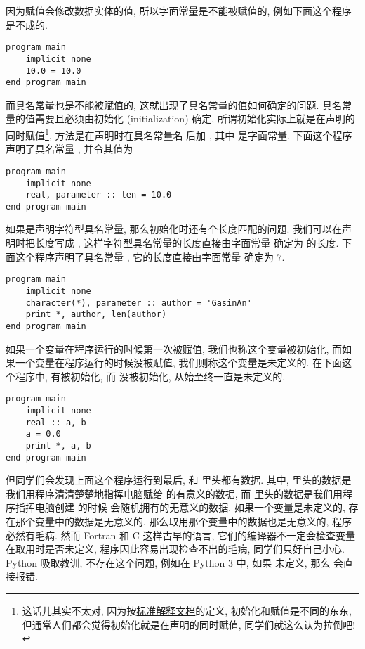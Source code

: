 因为赋值会修改数据实体的值, 所以字面常量是不能被赋值的, 例如下面这个程序是不成的.
\begin{lstlisting}
program main
    implicit none
    10.0 = 10.0
end program main
\end{lstlisting}
而具名常量也是不能被赋值的, 这就出现了具名常量的值如何确定的问题. 具名常量的值需要且必须由初始化 (initialization) 确定, 所谓初始化实际上就是在声明的同时赋值\footnote{这话儿其实不太对, 因为按\href{https://j3-fortran.org/doc/year/24/24-007.pdf}{标准解释文档}的定义, 初始化和赋值是不同的东东, 但通常人们都会觉得初始化就是在声明的同时赋值, 同学们就这么认为拉倒吧!}, 方法是在声明时在具名常量名 \ttt{[name]} 后加 \ttt{ = [value]}, 其中 \ttt{[value]} 是字面常量. 下面这个程序声明了具名常量 , 并令其值为 
\begin{lstlisting}
program main
    implicit none
    real, parameter :: ten = 10.0
end program main
\end{lstlisting}
如果是声明字符型具名常量, 那么初始化时还有个长度匹配的问题. 我们可以在声明时把长度写成 \ttt{*}, 这样字符型具名常量的长度直接由字面常量 \ttt{[value]} 确定为 \ttt{[value]} 的长度. 下面这个程序声明了具名常量 , 它的长度直接由字面常量  确定为 $7$.
\begin{lstlisting}
program main
    implicit none
    character(*), parameter :: author = 'GasinAn'
    print *, author, len(author)
end program main
\end{lstlisting}

如果一个变量在程序运行的时候第一次被赋值, 我们也称这个变量被初始化, 而如果一个变量在程序运行的时候没被赋值, 我们则称这个变量是未定义的. 在下面这个程序中,  有被初始化, 而  没被初始化, 从始至终一直是未定义的.
\begin{lstlisting}
program main
    implicit none
    real :: a, b
    a = 0.0
    print *, a, b
end program main
\end{lstlisting}
但同学们会发现上面这个程序运行到最后,  和  里头都有数据. 其中,  里头的数据是我们用程序清清楚楚地指挥电脑赋给  的有意义的数据, 而  里头的数据是我们用程序指挥电脑创建  的时候  会随机拥有的无意义的数据. 如果一个变量是未定义的, 存在那个变量中的数据是无意义的, 那么取用那个变量中的数据也是无意义的, 程序必然有毛病. 然而 Fortran 和 C 这样古早的语言, 它们的编译器不一定会检查变量在取用时是否未定义, 程序因此容易出现检查不出的毛病, 同学们只好自己小心. Python 吸取教训, 不存在这个问题, 例如在 Python 3 中, 如果  未定义, 那么  会直接报错.

